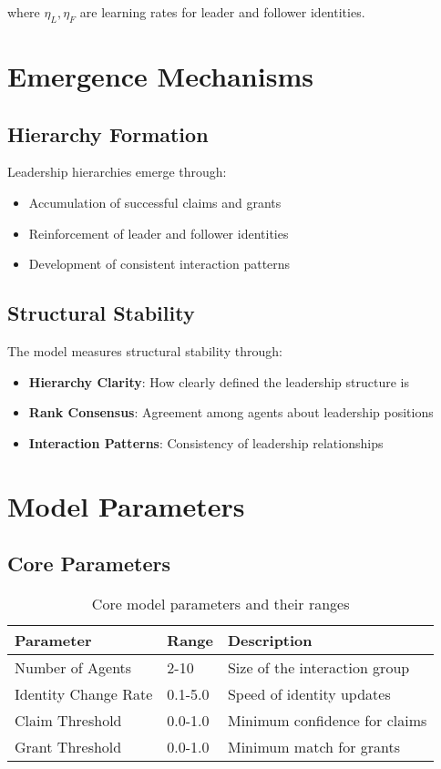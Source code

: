 \documentclass[12pt]{article}
\begin{document}
where $\eta_L, \eta_F$ are learning rates for leader and follower identities.

\section{Emergence Mechanisms}

\subsection{Hierarchy Formation}
Leadership hierarchies emerge through:
\begin{itemize}
    \item Accumulation of successful claims and grants
    \item Reinforcement of leader and follower identities
    \item Development of consistent interaction patterns
\end{itemize}

\subsection{Structural Stability}
The model measures structural stability through:
\begin{itemize}
    \item \textbf{Hierarchy Clarity}: How clearly defined the leadership structure is
    \item \textbf{Rank Consensus}: Agreement among agents about leadership positions
    \item \textbf{Interaction Patterns}: Consistency of leadership relationships
\end{itemize}

\section{Model Parameters}

\subsection{Core Parameters}
\begin{table}[H]
\centering
\begin{tabular}{lll}
\toprule
Parameter & Range & Description \\
\midrule
Number of Agents & 2-10 & Size of the interaction group \\
Identity Change Rate & 0.1-5.0 & Speed of identity updates \\
Claim Threshold & 0.0-1.0 & Minimum confidence for claims \\
Grant Threshold & 0.0-1.0 & Minimum match for grants \\
\bottomrule
\end{tabular}
\caption{Core model parameters and their ranges}
\end{table}
\end{document}
